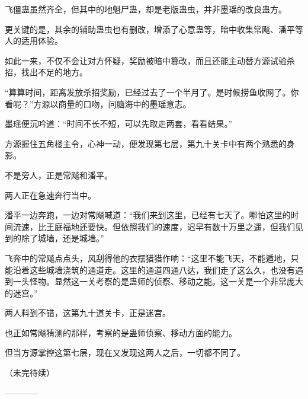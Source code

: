 \begin{this_body}
飞僵蛊虽然齐全，但其中的地魁尸蛊，却是老版蛊虫，并非墨瑶的改良蛊方。

更关键的是，其余的辅助蛊虫也有删改，增添了心意蛊等，暗中收集常飚、潘平等人的适用体验。

如此一来，不仅不会让对方怀疑，奖励被暗中篡改，而且还能主动替方源试验杀招，找出不足的地方。

“算算时间，距离发放杀招奖励，已经过去了一个半月了。是时候捞鱼收网了。你看呢？”方源以商量的口吻，问脑海中的墨瑶意志。

墨瑶便沉吟道：“时间不长不短，可以先取走两套，看看结果。”

方源握住五角楼主令，心神一动，便发现第七层，第九十关卡中有两个熟悉的身影。

不是旁人，正是常飚和潘平。

两人正在急速奔行当中。

潘平一边奔跑，一边对常飚喊道：“我们来到这里，已经有七天了。哪怕这里的时间流速，比王庭福地还要快。但依照我们的速度，迟早有数十万里之遥，但我们见到的除了城墙，还是城墙。”

飞奔中的常飚点点头，风刮得他的衣摆猎猎作响：“这里不能飞天，不能遁地，只能沿着这些城墙浇筑的通道走。这里的通道四通八达，我们走了这么久，也没有遇到一头怪物。显然这一关考察的是蛊师的侦察、移动之能。这一关是一个非常庞大的迷宫。”

两人料到不错，这第九十道关卡，正是迷宫。

也正如常飚猜测的那样，考察的是蛊师侦察、移动方面的能力。

但当方源掌控这第七层，现在又发现这两人之后，一切都不同了。

（未完待续）

------------

\end{this_body}

